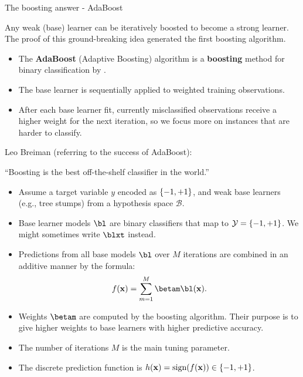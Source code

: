 \documentclass[11pt,compress,t,notes=noshow, xcolor=table]{beamer}
\begin{document}
\begin{vbframe}{The boosting answer - AdaBoost}

Any weak (base) learner can be iteratively boosted to become
a strong learner. %
The proof of this ground-breaking idea generated the first boosting algorithm.

\begin{itemize}
  \item The \textbf{AdaBoost} (Adaptive Boosting) algorithm is a \textbf{boosting} method
    for binary classification by .
  \item The base learner is sequentially applied to weighted training observations.
  \item After each base learner fit, currently misclassified observations receive a higher weight for
    the next iteration, so we focus more on instances that are harder to classify.
\end{itemize}

Leo Breiman (referring to the success of AdaBoost):

\enquote{Boosting is the best off-the-shelf classifier in the world.}

\framebreak

\begin{itemize}
  \item Assume a target variable $y$ encoded as $\{-1, +1\}$,
    and weak base learners (e.g., tree stumps) from a hypothesis space $\mathcal{B}$.
  \item Base learner models $\bl$ are binary classifiers that map to $\mathcal{Y} = \{-1, +1\}$.
    We might sometimes write $\blxt$ instead.
  \item Predictions from all base models $\bl$ over $M$ iterations are combined in an additive manner by the formula:
    $$
    \fx = \sum_{m=1}^{M} \betam \bl(\xv).
    $$
  \item Weights $\betam$ are computed by the boosting algorithm.
    Their purpose is to give higher weights to base learners with higher predictive accuracy.
  \item The number of iterations $M$ is the main tuning parameter.
  \item The discrete prediction function is $h(\mathbf{x}) = \text{sign}(f(\mathbf{x})) \in \{-1, +1\}$.
\end{itemize}


\end{vbframe}
\end{document}
